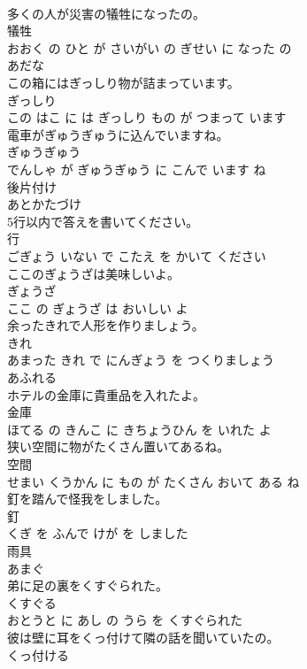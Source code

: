 \documentclass[8pt]{extreport}
\begin{document}
\begin{CJK}{UTF8}{min}
\\	多くの人が災害の犠牲になったの。	
\\	犠牲 
\\	おおく の ひと が さいがい の ぎせい に なった の			
\\	あだな	
\\	この箱にはぎっしり物が詰まっています。	
\\	ぎっしり 
\\	この はこ に は ぎっしり もの が つまって います			
\\	電車がぎゅうぎゅうに込んでいますね。	
\\	ぎゅうぎゅう 
\\	でんしゃ が ぎゅうぎゅう に こんで います ね			
\\	後片付け	
\\	あとかたづけ			
\\	5行以内で答えを書いてください。	
\\	行 
\\	ごぎょう いない で こたえ を かいて ください			
\\	ここのぎょうざは美味しいよ。	
\\	ぎょうざ 
\\	ここ の ぎょうざ は おいしい よ			
\\	余ったきれで人形を作りましょう。	
\\	きれ 
\\	あまった きれ で にんぎょう を つくりましょう			
\\	あふれる	
\\	ホテルの金庫に貴重品を入れたよ。	
\\	金庫 
\\	ほてる の きんこ に きちょうひん を いれた よ			
\\	狭い空間に物がたくさん置いてあるね。	
\\	空間 
\\	せまい くうかん に もの が たくさん おいて ある ね			
\\	釘を踏んで怪我をしました。	
\\	釘 
\\	くぎ を ふんで けが を しました			
\\	雨具	
\\	あまぐ			
\\	弟に足の裏をくすぐられた。	
\\	くすぐる 
\\	おとうと に あし の うら を くすぐられた			
\\	彼は壁に耳をくっ付けて隣の話を聞いていたの。	
\\	くっ付ける 

\end{CJK}
\end{document}
